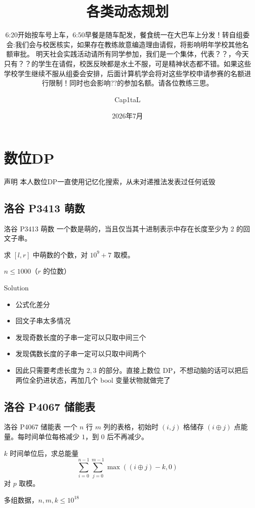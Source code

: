 ﻿\documentclass[aspectratio=169]{ctexbeamer}
\author{Cap1taL}
\title{各类动态规划}
\subtitle{6:20开始按车号上车，6:50早餐是随车配发，餐食统一在大巴车上分发！转自组委会:我们会与校医核实，如果存在教练故意编造理由请假，将影响明年学校其他名额审批。
明天社会实践活动请所有同学参加，我们是一个集体，代表？？，今天只有？？的学生在请假，校医反映都是水土不服，可是精神状态都不错。如果这些学校学生继续不服从组委会安排，后面计算机学会将对这些学校申请参赛的名额进行限制！同时也会影响??的参加名额。请各位教练三思。}
\date{2026年7月}
\begin{document}
\kaishu

\begin{frame}
    \titlepage
\end{frame}




\section{数位DP}

\begin{frame}{声明}
    本人数位DP一直使用记忆化搜索，从未对递推法发表过任何诋毁
\end{frame}

\subsection{洛谷 P3413 萌数}
\begin{frame}{洛谷 P3413 萌数}
    一个数是萌的，当且仅当其十进制表示中存在长度至少为 $2$ 的回文子串。
    
    求 $[l,r]$ 中萌数的个数，对 $10^9+7$ 取模。
    
    $n\le 1000$（$r$ 的位数）
\end{frame}

\begin{frame}{Solution}
    \begin{itemize}
        \item 公式化差分
        \item 回文子串太多情况
        \item 发现奇数长度的子串一定可以只取中间三个
        \item 发现偶数长度的子串一定可以只取中间两个
        \item 因此只需要考虑长度为 $2,3$ 的部分。直接上数位 DP，不想动脑的话可以把后两位全扔进状态，再加几个 bool 变量状物就做完了
    \end{itemize}
\end{frame}

\subsection{洛谷 P4067 储能表}
\begin{frame}{洛谷 P4067 储能表}
    一个 $n$ 行 $m$ 列的表格，初始时 $(i,j)$ 格储存 $(i\oplus j)$ 点能量。每时间单位每格减少 $1$，到 $0$ 后不再减少。
    
    $k$ 时间单位后，求总能量
    $$\sum_{i=0}^{n-1}\sum_{j=0}^{m-1}\max((i\oplus j)-k,0)$$
    对 $p$ 取模。
    
    多组数据，$n,m,k\le 10^{18}$
\end{frame}
\end{document}
